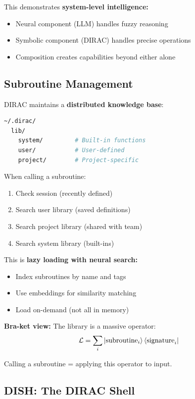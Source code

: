 \documentclass[11pt,a4paper]{article}
\theoremstyle{definition}
\begin{document}
This demonstrates \textbf{system-level intelligence:}
\begin{itemize}
\item Neural component (LLM) handles fuzzy reasoning
\item Symbolic component (DIRAC) handles precise operations
\item Composition creates capabilities beyond either alone
\end{itemize}

\subsection{Subroutine Management}

DIRAC maintains a \textbf{distributed knowledge base}:

\begin{lstlisting}[language=bash]
~/.dirac/
  lib/
    system/         # Built-in functions
    user/           # User-defined
    project/        # Project-specific
\end{lstlisting}

When calling a subroutine:
\begin{enumerate}
\item Check session (recently defined)
\item Search user library (saved definitions)
\item Search project library (shared with team)
\item Search system library (built-ins)
\end{enumerate}

This is \textbf{lazy loading with neural search:}
\begin{itemize}
\item Index subroutines by name and tags
\item Use embeddings for similarity matching
\item Load on-demand (not all in memory)
\end{itemize}

\textbf{Bra-ket view:} The library is a massive operator:
\begin{equation}
\mathcal{L} = \sum_i \ket{\text{subroutine}_i}\bra{\text{signature}_i}
\end{equation}

Calling a subroutine = applying this operator to input.

\subsection{DISH: The DIRAC Shell}
\end{document}
